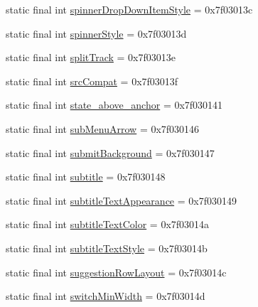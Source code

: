 \begin{DoxyCompactItemize}
\item 
static final int \mbox{\hyperlink{classandroid_1_1support_1_1v7_1_1appcompat_1_1R_1_1attr_ae53261907c675a6bc532a89886b0862a}{spinner\+Drop\+Down\+Item\+Style}} = 0x7f03013c
\item 
static final int \mbox{\hyperlink{classandroid_1_1support_1_1v7_1_1appcompat_1_1R_1_1attr_a19f854eb7d94b49f27128ea04c2e56e8}{spinner\+Style}} = 0x7f03013d
\item 
static final int \mbox{\hyperlink{classandroid_1_1support_1_1v7_1_1appcompat_1_1R_1_1attr_a34c0e22820db21795eb653b9315b0349}{split\+Track}} = 0x7f03013e
\item 
static final int \mbox{\hyperlink{classandroid_1_1support_1_1v7_1_1appcompat_1_1R_1_1attr_a31695dcc9a8798de0dcc6bc65128efdc}{src\+Compat}} = 0x7f03013f
\item 
static final int \mbox{\hyperlink{classandroid_1_1support_1_1v7_1_1appcompat_1_1R_1_1attr_a533ef94e418a4dc2ebaf0f7d5c382a3c}{state\+\_\+above\+\_\+anchor}} = 0x7f030141
\item 
static final int \mbox{\hyperlink{classandroid_1_1support_1_1v7_1_1appcompat_1_1R_1_1attr_ac31266b495aa965e97f9a4b189be9aa4}{sub\+Menu\+Arrow}} = 0x7f030146
\item 
static final int \mbox{\hyperlink{classandroid_1_1support_1_1v7_1_1appcompat_1_1R_1_1attr_ac3a5df86db68cc3fec7b8073db21715e}{submit\+Background}} = 0x7f030147
\item 
static final int \mbox{\hyperlink{classandroid_1_1support_1_1v7_1_1appcompat_1_1R_1_1attr_ab8de8dc640f29f618a046fe374b2f1b4}{subtitle}} = 0x7f030148
\item 
static final int \mbox{\hyperlink{classandroid_1_1support_1_1v7_1_1appcompat_1_1R_1_1attr_a7dcfcdda3ffdf6c31325aae638d168c5}{subtitle\+Text\+Appearance}} = 0x7f030149
\item 
static final int \mbox{\hyperlink{classandroid_1_1support_1_1v7_1_1appcompat_1_1R_1_1attr_a14f9d04e8f127eca7da40147affd83c5}{subtitle\+Text\+Color}} = 0x7f03014a
\item 
static final int \mbox{\hyperlink{classandroid_1_1support_1_1v7_1_1appcompat_1_1R_1_1attr_af9bdd5aa80719f41b93c78349fb16155}{subtitle\+Text\+Style}} = 0x7f03014b
\item 
static final int \mbox{\hyperlink{classandroid_1_1support_1_1v7_1_1appcompat_1_1R_1_1attr_a43fe9bcf135c6f96bb5a064d0173848b}{suggestion\+Row\+Layout}} = 0x7f03014c
\item 
static final int \mbox{\hyperlink{classandroid_1_1support_1_1v7_1_1appcompat_1_1R_1_1attr_a7dbf1d9843483d058a71f761bc51ec36}{switch\+Min\+Width}} = 0x7f03014d

\end{DoxyCompactItemize}

